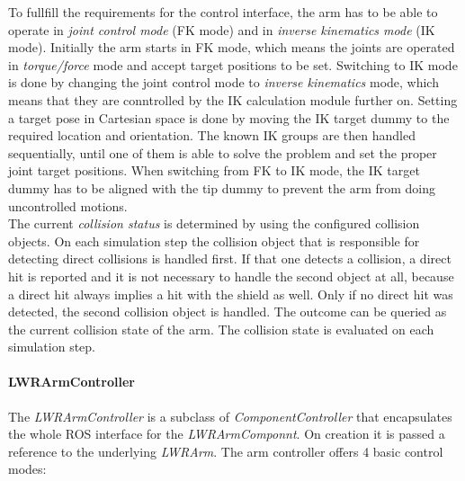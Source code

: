 To fullfill the requirements for the control interface, the arm has to be able to operate in \emph{joint control mode} (FK mode) and in \emph{inverse kinematics mode} (IK mode). Initially the arm starts in FK mode, which means the joints are operated in \emph{torque/force} mode and accept target positions to be set. Switching to IK mode is done by changing the joint control mode to \emph{inverse kinematics} mode, which means that they are conntrolled by the IK calculation module further on. Setting a target pose in Cartesian space is done by moving the IK target dummy to the required location and orientation. The known IK groups are then handled sequentially, until one of them is able to solve the problem and set the proper joint target positions. When switching from FK to IK mode, the IK target dummy has to be aligned with the tip dummy to prevent the arm from doing uncontrolled motions. \\

The current \emph{collision status} is determined by using the configured collision objects. On each simulation step the collision object that is responsible for detecting direct collisions is handled first. If that one detects a collision, a direct hit is reported and it is not necessary to handle the second object at all, because a direct hit always implies a hit with the shield as well. Only if no direct hit was detected, the second collision object is handled. The outcome can be queried as the current collision state of the arm. The collision state is evaluated on each simulation step.

\paragraph{LWRArmController}

The \emph{LWRArmController} is a subclass of \emph{ComponentController} that encapsulates the whole ROS interface for the \emph{LWRArmComponnt}. On creation it is passed a reference to the underlying \emph{LWRArm}. The arm controller offers 4 basic control modes:

